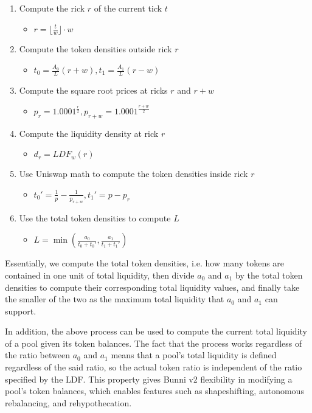 \documentclass[twocolumn]{article}
\begin{document}
\begin{enumerate}
  \item Compute the rick $r$ of the current tick $t$   
    \begin{itemize}
      \item $r = \lfloor \frac{t}{w} \rfloor \cdot w$  
    \end{itemize}
  \item Compute the token densities outside rick $r$
    \begin{itemize} 
      \item $t_0=\frac{A_0}{L}(r+w), t_1=\frac{A_1}{L}(r-w)$
    \end{itemize}
  \item Compute the square root prices at ricks $r$ and $r+w$ 
    \begin{itemize}
      \item $p_r = 1.0001^{\frac r2}, p_{r+w}=1.0001^{\frac{r+w}{2}}$
    \end{itemize}   
  \item Compute the liquidity density at rick $r$
    \begin{itemize}
      \item $d_r=LDF_w(r)$
    \end{itemize}
  \item Use Uniswap math to compute the token densities inside rick $r$
    \begin{itemize}
      \item $t_0'= \frac{1}{p}-\frac{1}{p_{r+w}}, t_1'=p - p_r$  
    \end{itemize}
  \item Use the total token densities to compute $L$
    \begin{itemize}
      \item $L = \min(\frac{a_0}{t_0 + t_0'}, \frac{a_1}{t_1 + t_1'})$
    \end{itemize}
\end{enumerate}

Essentially, we compute the total token densities, i.e. how many tokens are contained in one unit of total liquidity, then divide $a_0$ and $a_1$ by the total token densities to compute their corresponding total liquidity values, and finally take the smaller of the two as the maximum total liquidity that $a_0$ and $a_1$ can support. 

In addition, the above process can be used to compute the current total liquidity of a pool given its token balances. The fact that the process works regardless of the ratio between $a_0$ and $a_1$ means that a pool's total liquidity is defined regardless of the said ratio, so the actual token ratio is independent of the ratio specified by the LDF. This property gives Bunni v2 flexibility in modifying a pool's token balances, which enables features such as shapeshifting, autonomous rebalancing, and rehypothecation.
\end{document}
